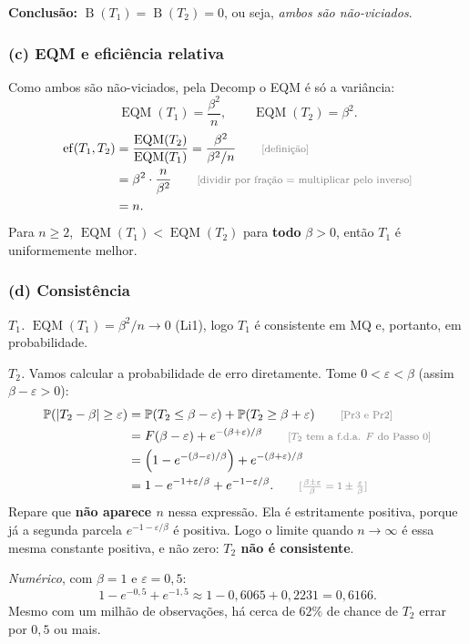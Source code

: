 \documentclass[11pt,a4paper]{article}
\theoremstyle{definition}
\theoremstyle{plain}
\newcommand{\EQM}{\operatorname{EQM}}
\newcommand{\B}{\operatorname{B}}
\newcommand{\Prob}{\mathbb{P}}
\newcommand{\just}[1]{\tag*{\footnotesize\textcolor{gray}{[#1]}}}
\begin{document}
\textbf{Conclusão:} $\B(T_1)=\B(T_2)=0$, ou seja, \emph{ambos são não-viciados}.

\subsubsection*{(c) EQM e eficiência relativa}
Como ambos são não-viciados, pela Decomp o EQM é só a variância:
\[
\EQM(T_1)=\frac{\beta^2}{n},\qquad\EQM(T_2)=\beta^2 .
\]
\begin{align*}
\operatorname{ef}(T_1,T_2)&=\frac{\EQM(T_2)}{\EQM(T_1)}=\frac{\beta^2}{\beta^2/n} \just{definição}\\
&=\beta^2\cdot\frac{n}{\beta^2} \just{dividir por fração = multiplicar pelo inverso}\\
&=n .
\end{align*}
Para $n\ge2$, $\EQM(T_1)<\EQM(T_2)$ para \textbf{todo} $\beta>0$, então $T_1$ é uniformemente melhor.

\subsubsection*{(d) Consistência}
\textit{$T_1$.} $\EQM(T_1)=\beta^2/n\to0$ (Li1), logo $T_1$ é consistente em MQ e, portanto, em probabilidade.

\textit{$T_2$.} Vamos calcular a probabilidade de erro diretamente. Tome $0<\varepsilon<\beta$ (assim $\beta-\varepsilon>0$):
\begin{align*}
\Prob(|T_2-\beta|\ge\varepsilon)&=\Prob(T_2\le\beta-\varepsilon)+\Prob(T_2\ge\beta+\varepsilon) \just{Pr3 e Pr2}\\
&=F(\beta-\varepsilon)+e^{-(\beta+\varepsilon)/\beta} \just{$T_2$ tem a f.d.a. $F$ do Passo 0}\\
&=\Big(1-e^{-(\beta-\varepsilon)/\beta}\Big)+e^{-(\beta+\varepsilon)/\beta}\\
&=1-e^{-1+\varepsilon/\beta}+e^{-1-\varepsilon/\beta}. \just{$\frac{\beta\pm\varepsilon}{\beta}=1\pm\frac\varepsilon\beta$}
\end{align*}
Repare que \textbf{não aparece $n$} nessa expressão. Ela é estritamente positiva, porque já a segunda parcela $e^{-1-\varepsilon/\beta}$ é positiva. Logo o limite quando $n\to\infty$ é essa mesma constante positiva, e não zero: \textbf{$T_2$ não é consistente}.

\textit{Numérico}, com $\beta=1$ e $\varepsilon=0{,}5$:
\[
1-e^{-0{,}5}+e^{-1{,}5}\approx1-0{,}6065+0{,}2231=0{,}6166 .
\]
Mesmo com um milhão de observações, há cerca de $62\%$ de chance de $T_2$ errar por $0{,}5$ ou mais.
\end{document}
